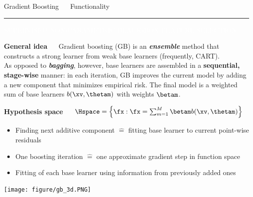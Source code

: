 \documentclass[11pt,compress,t,notes=noshow, xcolor=table]{beamer}
\begin{document}
\LARGE
\begin{frame}{\textcolor{gray!80}{Gradient Boosting} ~~ Functionality}
\normalsize
\vspace{-0.5cm}
\noindent \textcolor{gray!80}{\rule{\textwidth}{1pt}}

\vspace{0.3cm}

\footnotesize

\colorbox{gray!80}{\textcolor{white}{SUPERVISED}} 
\colorbox{gray!80}{\textcolor{white}{NON-PARAMETRIC}} 
\colorbox{gray!80}{\textcolor{white}{BLACK-BOX}}
\colorbox{gray!80}{\textcolor{white}{FEATURE SELECTION}}

\medskip

\textbf{\textcolor{gray!80}{General idea}} ~~ Gradient boosting (GB) is an
\textit{\textbf{ensemble}} method that constructs a strong learner from weak 
base learners (frequently, CART). \\
As opposed to \textit{\textbf{bagging}}, however, base learners are assembled
in a \textbf{sequential, stage-wise} manner: in each iteration, GB improves the 
current model by adding a new component that minimizes empirical risk. The final 
model is a weighted sum of base learners $b(\xv, \thetam)$ with weights 
$\betam$.

\medskip

\textbf{\textcolor{gray!80}{Hypothesis space}} ~~
$\Hspace = \left\{ \fx: \fx = \sum_{m = 1}^M \betam b(\xv, \thetam) \right\}$

\medskip

\begin{minipage}{0.6\textwidth}
  \begin{itemize}
    \item Finding next additive component $\widehat{=}$ fitting base learner
    to current point-wise residuals  
    \item One boosting iteration $\widehat{=}$ one approximate gradient step in 
    function space
    \item Fitting of each base learner using information from previously
    added ones
  \end{itemize}
\end{minipage}%
\begin{minipage}{0.4\textwidth}
  \texttt{[image: figure/gb\_3d.PNG]}
\end{minipage}

\end{frame}

\end{document}
